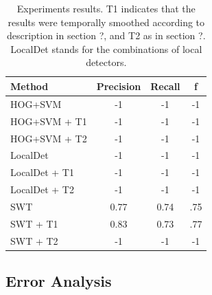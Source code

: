 \documentclass{bmvc2k}
\begin{document}
\begin{table}
\begin{center}
\begin{tabular}{|l|c|c|c|}
\hline
Method & Precision & Recall & f\\
\hline
HOG+SVM 			& -1 		& -1 & -1\\
HOG+SVM + T1 	& -1 		& -1 & -1\\
HOG+SVM + T2 	& -1 		& -1 & -1\\
LocalDet 		& -1 		& -1 & -1\\
LocalDet + T1 	& -1			& -1 & -1\\
LocalDet + T2 	& -1			& -1 & -1\\
SWT 				& 0.77 		& 0.74 & .75\\
SWT + T1 		& 0.83		& 0.73 & .77\\
SWT + T2 		& -1			& -1 & -1\\
\hline
\end{tabular}
\end{center}
\caption{Experiments results. T1 indicates that the results were temporally smoothed according to description in section ?, and T2 as in section ?. LocalDet stands for the combinations of local detectors.}
\end{table}

\subsection{Error Analysis}


\end{document}
